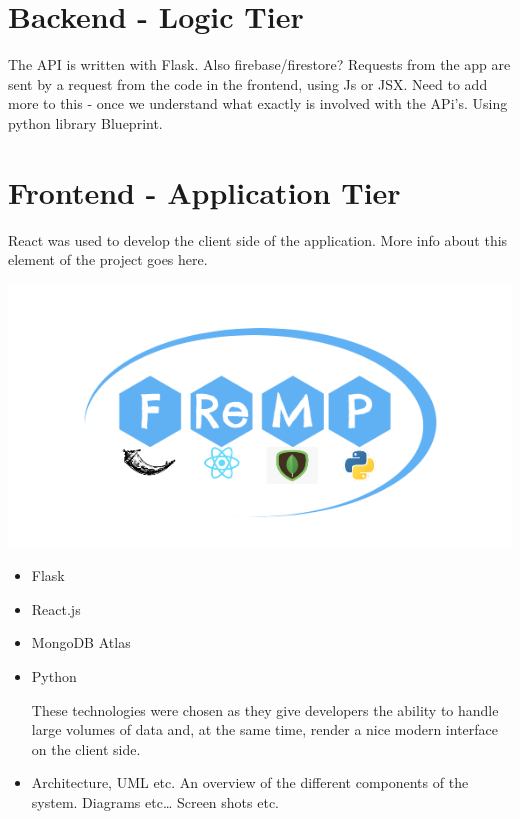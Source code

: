 \section{Backend - Logic Tier}
The API is written with Flask. Also firebase/firestore? 
Requests from the app are sent by a request from the code in the frontend, using Js or JSX.
Need to add more to this - once we understand what exactly is involved with the APi's.
Using python library Blueprint.

\section{Frontend - Application Tier}
React was used to develop the client side of the application. 
More info about this element of the project goes here.
\begin{center}    
      \includegraphics{img/fremp.PNG}
\end{center}

\begin{itemize}
\item Flask
\item React.js
\item MongoDB Atlas
\item Python


These technologies were chosen as they give developers the ability to handle large volumes of data and, at the same time, render a nice modern interface on the client side. 
\item Architecture, UML etc. An overview of the different components of the system. Diagrams etc… Screen shots etc.
\end{itemize}

